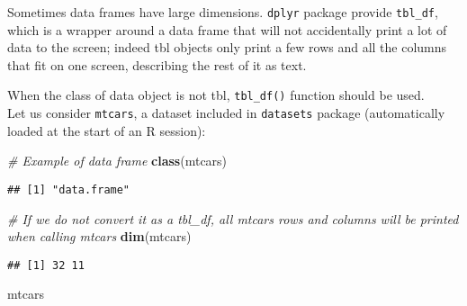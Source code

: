 \documentclass[]{book}
\newenvironment{Shaded}{\begin{snugshade}}{\end{snugshade}}
\newcommand{\KeywordTok}[1]{\textcolor[rgb]{0.13,0.29,0.53}{\textbf{{#1}}}}
\newcommand{\CommentTok}[1]{\textcolor[rgb]{0.56,0.35,0.01}{\textit{{#1}}}}
\newcommand{\NormalTok}[1]{{#1}}
\begin{document}
Sometimes data frames have large dimensions. \texttt{dplyr} package
provide \texttt{tbl\_df}, which is a wrapper around a data frame that
will not accidentally print a lot of data to the screen; indeed tbl
objects only print a few rows and all the columns that fit on one
screen, describing the rest of it as text.

When the class of data object is not tbl, \texttt{tbl\_df()} function
should be used.\\
Let us consider \texttt{mtcars}, a dataset included in \texttt{datasets}
package (automatically loaded at the start of an R session):

\begin{Shaded}
\begin{Highlighting}[]
\CommentTok{# Example of data frame}
\KeywordTok{class}\NormalTok{(mtcars)}
\end{Highlighting}
\end{Shaded}

\begin{verbatim}
## [1] "data.frame"
\end{verbatim}

\begin{Shaded}
\begin{Highlighting}[]
\CommentTok{# If we do not convert it as a tbl_df, all mtcars rows and columns will be printed when calling mtcars }
\KeywordTok{dim}\NormalTok{(mtcars)}
\end{Highlighting}
\end{Shaded}

\begin{verbatim}
## [1] 32 11
\end{verbatim}

\begin{Shaded}
\begin{Highlighting}[]
\NormalTok{mtcars}
\end{Highlighting}
\end{Shaded}
\end{document}
